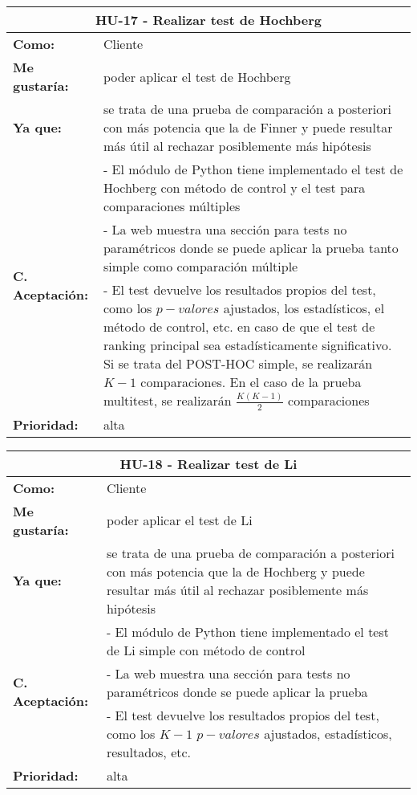 \begin{table}[H]
	\begin{tabular}{| p{3cm}| p{12cm} |}
		\hline
		\multicolumn{2}{|c|}{\textbf{HU-17} - Realizar test de Hochberg} \\ \hline
		\textbf{Como:} & Cliente \\ \hline
		\textbf{Me gustaría:} & poder aplicar el test de Hochberg \\ \hline
		\textbf{Ya que:} & se trata de una prueba de comparación a posteriori con más potencia que la de Finner y puede resultar más útil al rechazar posiblemente más hipótesis \\ \hline
		\multirow{3}{12cm}{\textbf{C. Aceptación:}} & - El módulo de Python tiene implementado el test de Hochberg con método de control y el test para comparaciones múltiples \\
		& - La web muestra una sección para tests no paramétricos donde se puede aplicar la prueba tanto simple como comparación múltiple \\
		& - El test devuelve los resultados propios del test, como los $p-valores$ ajustados, los estadísticos, el método de control, etc. en caso de que el test de ranking principal sea estadísticamente significativo. Si se trata del POST-HOC simple, se realizarán $K-1$ comparaciones. En el caso de la prueba multitest, se realizarán $\frac{K(K-1)}{2}$ comparaciones \\ \hline
		\textbf{\textbf{Prioridad:}} & alta \\ \hline
	\end{tabular}
\end{table}


\begin{table}[H]
	\begin{tabular}{| p{3cm}| p{12cm} |}
		\hline
		\multicolumn{2}{|c|}{\textbf{HU-18} - Realizar test de Li} \\ \hline
		\textbf{Como:} & Cliente \\ \hline
		\textbf{Me gustaría:} & poder aplicar el test de Li \\ \hline
		\textbf{Ya que:} & se trata de una prueba de comparación a posteriori con más potencia que la de Hochberg y puede resultar más útil al rechazar posiblemente más hipótesis \\ \hline
		\multirow{3}{12cm}{\textbf{C. Aceptación:}} & - El módulo de Python tiene implementado el test de Li simple con método de control \\
		& - La web muestra una sección para tests no paramétricos donde se puede aplicar la prueba \\
		& - El test devuelve los resultados propios del test, como los $K-1$ $p-valores$ ajustados, estadísticos, resultados, etc. \\ \hline
		\textbf{\textbf{Prioridad:}} & alta \\ \hline
	\end{tabular}
\end{table}


